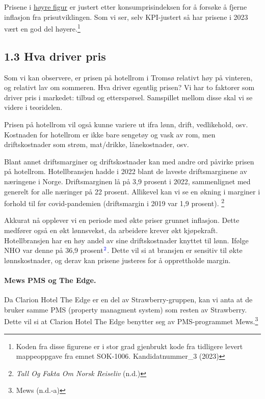 \documentclass[
  12pt,
  a4paper,
  DIV=11,
  numbers=noendperiod]{scrartcl}
\let\oldparagraph\paragraph
\renewcommand{\paragraph}[1]{\oldparagraph{#1}\mbox{}}
\begin{document}
Prisene i \hyperref[fig:ssbdata]{høyre figur} er justert etter
konsumprisindeksen for å forsøke å fjerne inflasjon fra prisutviklingen.
Som vi ser, selv KPI-justert så har prisene i 2023 vært en god del
høyere.\footnote{Koden fra disse figurene er i stor grad gjenbrukt kode
  fra tidligere levert mappeoppgave fra emnet SOK-1006.
  Kandidatnummer\_3 (2023)}

\clearpage

\subsection{1.3 Hva driver pris}\label{hva-driver-pris}

Som vi kan observere, er prisen på hotellrom i Tromsø relativt høy på
vinteren, og relativt lav om sommeren. Hva driver egentlig prisen? Vi
har to faktorer som driver pris i markedet: tilbud og etterspørsel.
Samspillet mellom disse skal vi se videre i teoridelen.

Prisen på hotellrom vil også kunne variere ut ifra lønn, drift,
vedlikehold, osv. Kostnaden for hotellrom er ikke bare sengetøy og vask
av rom, men driftskostnader som strøm, mat/drikke, lånekostnader, osv.

Blant annet driftsmarginer og driftskostnader kan med andre ord påvirke
prisen på hotellrom. Hotellbransjen hadde i 2022 blant de laveste
driftsmarginene av næringene i Norge. Driftsmarginen lå på 3,9 prosent i
2022, sammenlignet med generelt for alle næringer på 22 prosent.
Allikevel kan vi se en økning i marginer i forhold til før
covid-pandemien (driftsmargin i 2019 var 1,9 prosent). \footnote{\emph{Tall
  Og Fakta Om Norsk Reiseliv} (n.d.)}

Akkurat nå opplever vi en periode med økte priser grunnet inflasjon.
Dette medfører også en økt lønnsvekst, da arbeidere krever økt
kjøpekraft. Hotellbransjen har en høy andel av sine driftskostnader
knyttet til lønn. Ifølge NHO var denne på 36,9
prosent\(\color{blue}{^2}\). Dette vil si at bransjen er sensitiv til
økte lønnskostnader, og derav kan prisene justeres for å opprettholde
margin.

\paragraph{Mews PMS og The Edge.}\label{mews-pms-og-the-edge.}

Da Clarion Hotel The Edge er en del av Strawberry-gruppen, kan vi anta
at de bruker samme PMS (property managment system) som resten av
Strawberry. Dette vil si at Clarion Hotel The Edge benytter seg av
PMS-programmet Mews.\footnote{Mews (n.d.-a)}
\end{document}
